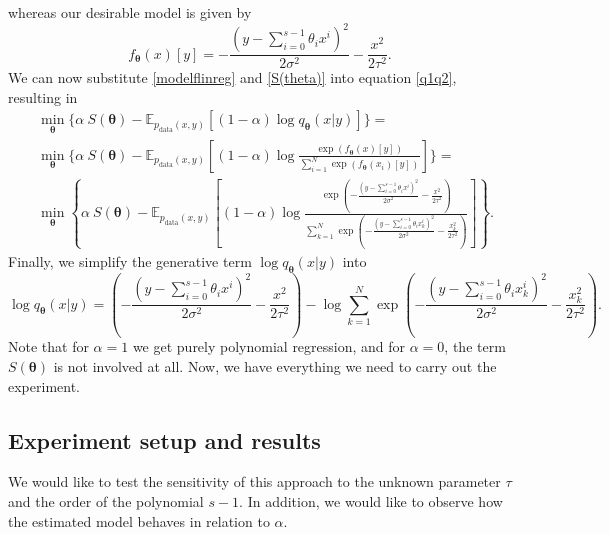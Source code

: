 whereas our desirable model is given by
\begin{equation}\label{modelflinreg}
	f_{\boldsymbol{\theta}}(x)[y] = -\frac{\left(y-\sum_{i=0}^{s-1} \theta_i x^i\right)^2}{2\sigma^2} - \frac{x^2}{2\tau^2}.
\end{equation}
We can now substitute \eqref{modelflinreg} and \eqref{S(theta)} into equation \eqref{q1q2}, resulting in
\begin{align}\label{eq:SSEq}
	&\min_{\boldsymbol{\theta}}\Big\lbrace \alpha~S(\boldsymbol{\theta}) - \mathbb{E}_{p_{\mathrm{data}}(x,y)}\left[ \left(1-\alpha\right)\log q_{\boldsymbol{\theta}}\left(x|y\right) \right] \Big\rbrace  =\\
	&\min_{\boldsymbol{\theta}}\Bigg\lbrace \alpha~S(\boldsymbol{\theta}) - \mathbb{E}_{p_{\mathrm{data}}(x,y)}\left[ \left(1-\alpha\right)\log \frac{\exp\left({f_{\boldsymbol{\theta}}\left(x\right)[y]}\right)}{\sum_{i=1}^N\exp\left({f_{\boldsymbol{\theta}}\left(x_i\right)[y]}\right)} \right] \Bigg\rbrace  =\\
	&\min_{\boldsymbol{\theta}}\left\lbrace \alpha~S(\boldsymbol{\theta}) - \mathbb{E}_{p_{\mathrm{data}}(x,y)}\left[ \left(1-\alpha\right)\log \frac{\exp\left({-\frac{\left(y- \sum_{i=0}^{s-1} \theta_i x^i     \right)^2}{2\sigma^2} - \frac{x^2}{2\tau^2}}\right)}{\sum_{k=1}^N\exp\left({-\frac{\left(y-\sum_{i=0}^{s-1} \theta_i x_k^i\right)^2}{2\sigma^2} - \frac{x_k^2}{2\tau^2}}\right)} \right] \right\rbrace.  
\end{align}
Finally, we simplify the generative term $\log q_{\boldsymbol{\theta}}\left(x|y\right)$ into
\begin{equation}
	\log q_{\boldsymbol{\theta}}\left(x|y\right) =  \left(-\frac{\left(y-\sum_{i=0}^{s-1} \theta_i x^i\right)^2}{2\sigma^2} - \frac{x^2}{2\tau^2}\right) - \log \sum_{k=1}^N\exp\left({-\frac{\left(y-\sum_{i=0}^{s-1} \theta_i x_k^i\right)^2}{2\sigma^2} - \frac{x_k^2}{2\tau^2}}\right).
\end{equation}
Note that for $\alpha =1$ we get purely polynomial regression, and for $\alpha =0$, the term $S(\boldsymbol{\theta})$ is not involved at all. Now, we have everything we need to carry out the experiment.
\subsection{Experiment setup and results}
We would like to test the sensitivity of this approach to the unknown parameter $\tau$ and the order of the polynomial $s-1$. In addition, we would like to observe how the estimated model behaves in relation to $\alpha$. 

